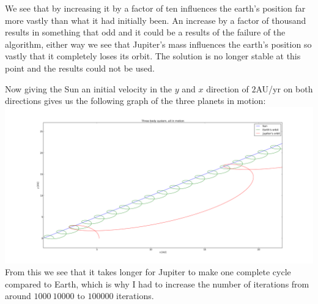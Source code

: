 \documentclass{article}
\begin{document}
We see that by increasing it by a factor of ten influences the earth's position far more vastly than what it had initially been. An increase by a factor of thousand results in something that odd and it could be a results of the failure of the algorithm, either way we see that Jupiter's mass influences the earth's position so vastly that it completely loses its orbit. The solution is no longer stable at this point and the results could not be used.   

Now giving the Sun an initial velocity in the $y$ and $x$ direction of $2$AU/yr on both directions gives us the following graph of the three planets in motion:\\
\includegraphics[scale=0.3]{figure_6.png}\\
From this we see that it takes longer for Jupiter to make one complete cycle compared to Earth, which is why I had to increase the number of iterations from around $1000~10000$ to $100000$ iterations. 
\end{document}
